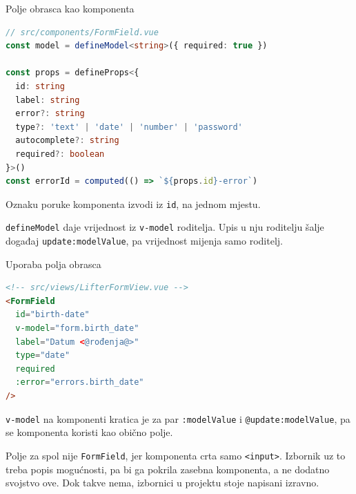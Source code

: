 \begin{frame}[fragile]{Polje obrasca kao komponenta}
\begin{lstlisting}[language=typescript]
// src/components/FormField.vue
const model = defineModel<string>({ required: true })

const props = defineProps<{
  id: string
  label: string
  error?: string
  type?: 'text' | 'date' | 'number' | 'password'
  autocomplete?: string
  required?: boolean
}>()
const errorId = computed(() => `${props.id}-error`)
\end{lstlisting}

\vspace{0.2em}
Oznaku poruke komponenta izvodi iz \texttt{id}, na jednom mjestu.

\vspace{0.2em}
\texttt{defineModel} daje vrijednost iz \texttt{v-model} roditelja. Upis u nju roditelju šalje događaj \texttt{update:modelValue}, pa vrijednost mijenja samo roditelj.
\end{frame}

\begin{frame}[fragile]{Uporaba polja obrasca}
\begin{lstlisting}[language=html]
<!-- src/views/LifterFormView.vue -->
<FormField
  id="birth-date"
  v-model="form.birth_date"
  label="Datum <@rođenja@>"
  type="date"
  required
  :error="errors.birth_date"
/>
\end{lstlisting}

\vspace{0.3em}
\texttt{v-model} na komponenti kratica je za par \texttt{:modelValue} i \texttt{@update:modelValue}, pa se komponenta koristi kao obično polje.

\vspace{0.3em}
Polje za spol nije \texttt{FormField}, jer komponenta crta samo \texttt{<input>}. Izbornik uz to treba popis mogućnosti, pa bi ga pokrila zasebna komponenta, a ne dodatno svojstvo ove. Dok takve nema, izbornici u projektu stoje napisani izravno.
\end{frame}

